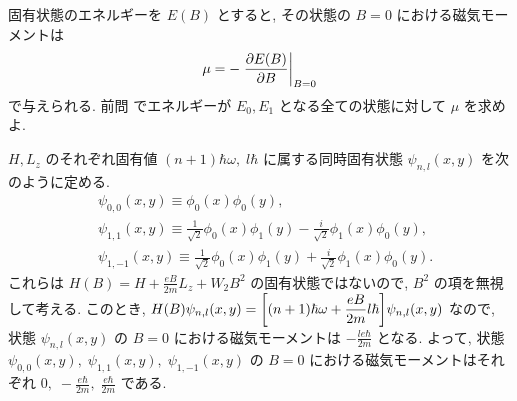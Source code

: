 \documentclass[../../ou-physics-exam.tex]{subfiles}
\begin{document}
固有状態のエネルギーを $ E(B) $ とすると, その状態の $ B = 0 $ における磁気モーメントは
\begin{align*}
    \mu = - \left. \pdv{E(B)}{B} \right|_{B=0}
\end{align*}
で与えられる. 
前問  でエネルギーが $ E_0, E_1 $ となる全ての状態に対して $ \mu $ を求めよ.
\begin{answer}
    $ H, L_z $ のそれぞれ固有値 $ (n + 1) \hbar \omega , \; l \hbar $ に属する同時固有状態 $ \psi_{n, l} (x, y) $ を次のように定める.
    \begin{align*}
        & \psi_{0, 0} (x, y) \equiv \phi_0 (x) \phi_0 (y), \\
        & \psi_{1, 1} (x, y) \equiv \frac{1}{\sqrt{2}} \phi_0 (x) \phi_1 (y) - \frac{i}{\sqrt{2}} \phi_1 (x) \phi_0 (y), \\
        & \psi_{1, -1} (x, y) \equiv \frac{1}{\sqrt{2}} \phi_0 (x) \phi_1 (y) + \frac{i}{\sqrt{2}} \phi_1 (x) \phi_0 (y).
    \end{align*}
    これらは $ \displaystyle H(B) = H + \frac{eB}{2m} L_z + W_2 B^2 $ の固有状態ではないので, $ B^2 $ の項を無視して考える.
    このとき, $ \displaystyle H(B) \psi_{n, l} (x, y) = \qty[(n+1) \hbar \omega + \frac{eB}{2m} l \hbar ] \psi_{n, l} (x, y) $ なので, 状態 $ \psi_{n, l} (x, y) $ の $ B = 0 $ における磁気モーメントは $ \displaystyle - \frac{le \hbar}{2m} $ となる. 
    よって, 状態 $ \psi_{0, 0} (x, y), \; \psi_{1, 1} (x, y), \; \psi_{1, -1} (x, y) $ の $ B = 0 $ における磁気モーメントはそれぞれ $ \displaystyle 0, \; - \frac{e \hbar}{2m}, \; \frac{e \hbar}{2m} $ である.
\end{answer}
\end{document}
